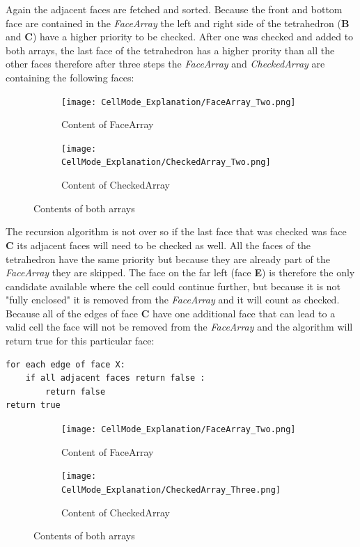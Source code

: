 \documentclass{report}
\begin{document}
		\noindent Again the adjacent faces are fetched and sorted. Because the front and bottom face are contained in the \textit{FaceArray} the left and right side of the tetrahedron (\textbf{B} and \textbf{C}) have a higher priority to be checked. After one was checked and added to both arrays, the last face of the tetrahedron has a higher prority than all the other faces therefore after three steps the \textit{FaceArray} and \textit{CheckedArray} are containing the following faces: \\
		\begin{figure}[H]
			\centering
			\begin{subfigure}[H]{2.5in}
				\centering
				\texttt{[image: CellMode\_Explanation/FaceArray\_Two.png]}
				\caption{Content of FaceArray}
				\label{pic:pic5.5.a}
			\end{subfigure}
			\quad
			\begin{subfigure}[H]{2.5in}
				\centering
				\texttt{[image: CellMode\_Explanation/CheckedArray\_Two.png]}
				\caption{Content of CheckedArray}
				\label{pic:pic5.5.b}
			\end{subfigure}
			\caption{Contents of both arrays}
			\label{pic:pic5.5}
		\end{figure}
		\noindent The recursion algorithm is not over so if the last face that was checked was face \textbf{C} its adjacent faces will need to be checked as well. All the faces of the tetrahedron have the same priority but because they are already part of the \textit{FaceArray} they are skipped. The face on the far left (face \textbf{E}) is therefore the only candidate available where the cell could continue further, but because it is not "fully enclosed" it is removed from the \textit{FaceArray} and it will count as checked. Because all of the edges of face \textbf{C} have one additional face that can lead to a valid cell the face will not be removed from the \textit{FaceArray} and the algorithm will return true for this particular face:
		\begin{verbatim}
for each edge of face X:
	if all adjacent faces return false :
		return false
return true
		\end{verbatim}
		\begin{figure}[H]
			\centering
			\begin{subfigure}[H]{2.5in}
				\centering
				\texttt{[image: CellMode\_Explanation/FaceArray\_Two.png]}
				\caption{Content of FaceArray}
				\label{pic:pic5.6.a}
			\end{subfigure}
			\quad
			\begin{subfigure}[H]{2.5in}
				\centering
				\texttt{[image: CellMode\_Explanation/CheckedArray\_Three.png]}
				\caption{Content of CheckedArray}
				\label{pic:pic5.6.b}
			\end{subfigure}
			\caption{Contents of both arrays}
			\label{pic:pic5.6}
		\end{figure}
\end{document}
